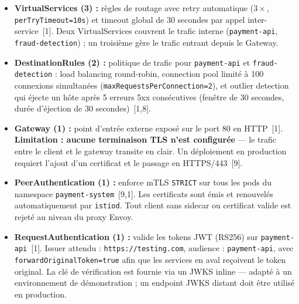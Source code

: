 \begin{itemize}[topsep=4pt, itemsep=6pt]

  \item \textbf{VirtualServices (3) :} règles de routage avec retry automatique
        ($3\times$, \texttt{perTryTimeout=10s}) et timeout global de 30 secondes
        par appel inter-service~[1]. Deux VirtualServices couvrent le trafic
        interne (\texttt{payment-api}, \texttt{fraud-detection}) ; un troisième
        gère le trafic entrant depuis le Gateway.

  \item \textbf{DestinationRules (2) :} politique de trafic pour
        \texttt{payment-api} et \texttt{fraud-detection} : load balancing
        round-robin, connection pool limité à 100 connexions simultanées
        (\texttt{maxRequestsPerConnection=2}), et outlier detection qui éjecte
        un hôte après 5 erreurs 5xx consécutives (fenêtre de 30 secondes,
        durée d'éjection de 30 secondes)~[1,8].

  \item \textbf{Gateway (1) :} point d'entrée externe exposé sur le port 80 en
        HTTP~[1]. \textbf{Limitation : aucune terminaison TLS n'est configurée}
        --- le trafic entre le client et le gateway transite en clair. Un
        déploiement en production requiert l'ajout d'un certificat et le passage
        en HTTPS/443~[9].

  \item \textbf{PeerAuthentication (1) :} enforce mTLS \texttt{STRICT} sur tous
        les pods du namespace \texttt{payment-system}~[9,1]. Les certificats sont
        émis et renouvelés automatiquement par \texttt{istiod}. Tout client sans
        sidecar ou certificat valide est rejeté au niveau du proxy Envoy.

  \item \textbf{RequestAuthentication (1) :} valide les tokens JWT (RS256) sur
        \texttt{payment-api}~[1]. Issuer attendu : \texttt{https://testing.com},
        audience : \texttt{payment-api}, avec \texttt{forwardOriginalToken=true}
        afin que les services en aval reçoivent le token original. La clé de
        vérification est fournie via un JWKS inline --- adapté à un environnement
        de démonstration ; un endpoint JWKS distant doit être utilisé en
        production.


\end{itemize}

